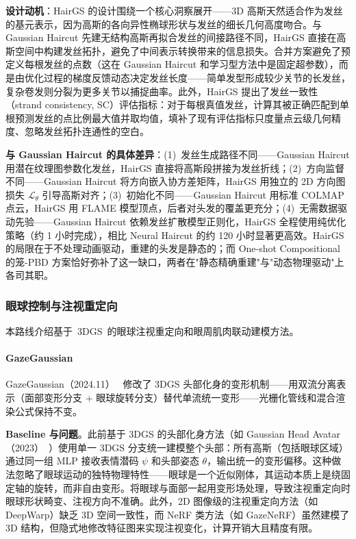 \textbf{设计动机}：HairGS 的设计围绕一个核心洞察展开——3D 高斯天然适合作为发丝的基元表示，因为高斯的各向异性椭球形状与发丝的细长几何高度吻合。与 Gaussian Haircut 先建无结构高斯再拟合发丝的间接路径不同，HairGS 直接在高斯空间中构建发丝拓扑，避免了中间表示转换带来的信息损失。合并方案避免了预定义每根发丝的点数（这在 Gaussian Haircut 和学习型方法中是固定超参数），而是由优化过程的梯度反馈动态决定发丝长度——简单发型形成较少关节的长发丝，复杂卷发则分裂为更多关节以捕捉曲率。此外，HairGS 提出了发丝一致性（strand consistency, SC）评估指标：对于每根真值发丝，计算其被正确匹配到单根预测发丝的点比例最大值并取均值，填补了现有评估指标只度量点云级几何精度、忽略发丝拓扑连通性的空白。

\textbf{与 Gaussian Haircut 的具体差异}：(1)~发丝生成路径不同——Gaussian Haircut 用潜在纹理图参数化发丝，HairGS 直接将高斯段拼接为发丝折线；(2)~方向监督不同——Gaussian Haircut 将方向嵌入协方差矩阵，HairGS 用独立的 2D 方向图损失 $\mathcal{L}_\theta$ 引导高斯对齐；(3)~初始化不同——Gaussian Haircut 用标准 COLMAP 点云，HairGS 用 FLAME 模型顶点，后者对头发的覆盖更充分；(4)~无需数据驱动先验——Gaussian Haircut 依赖发丝扩散模型正则化，HairGS 全程使用纯优化策略（约 1 小时完成），相比 Neural Haircut 的约 120 小时显著更高效。HairGS 的局限在于不处理动画驱动，重建的头发是静态的；而 One-shot Compositional 的笼-PBD 方案恰好弥补了这一缺口，两者在"静态精确重建"与"动态物理驱动"上各司其职。

\subsubsection{眼球控制与注视重定向}

本路线介绍基于~3DGS~的眼球注视重定向和眼周肌肉联动建模方法。

\paragraph{GazeGaussian}

GazeGaussian（2024.11）~\cite{2411_12981} 修改了 3DGS 头部化身的变形机制——用双流分离表示（面部变形分支 + 眼球旋转分支）替代单流统一变形——光栅化管线和混合渲染公式保持不变。

\textbf{Baseline 与问题}。此前基于 3DGS 的头部化身方法（如 Gaussian Head Avatar（2023）~\cite{xu2023gaussianheadavatar}）使用单一 3DGS 分支统一建模整个头部：所有高斯（包括眼球区域）通过同一组 MLP 接收表情潜码 $\psi$ 和头部姿态 $\theta$，输出统一的变形偏移。这种做法忽略了眼球运动的独特物理特性——眼球是一个近似刚体，其运动本质上是绕固定轴的旋转，而非自由变形。将眼球与面部一起用变形场处理，导致注视重定向时眼球形状畸变、注视方向不准确。此外，2D 图像级的注视重定向方法（如 DeepWarp）缺乏 3D 空间一致性，而 NeRF 类方法（如 GazeNeRF）虽然建模了 3D 结构，但隐式地修改特征图来实现注视变化，计算开销大且精度有限。

